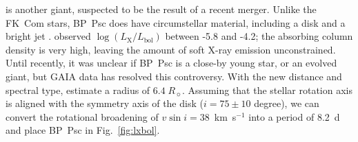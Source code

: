 \documentclass[linenumbers]{aastex631}
\begin{document}
 is another giant, suspected to be the result of a recent merger. Unlike the FK~Com stars, BP~Psc does have circumstellar material, including a disk and a bright jet \citep{Zuckerman_2008}.
\citet{2010ApJ...719L..65K} observed $\log(L_\mathrm{X}/L_\mathrm{bol})$ between -5.8 and -4.2; the absorbing column density is very high, leaving the amount of soft X-ray emission unconstrained. Until recently, it was unclear if BP~Psc is a close-by young star, or an evolved giant, but GAIA data has resolved this controversy. With the new distance and spectral type, \citet{2019MNRAS.490.3158C} estimate a radius of $6.4\;R_\sun{}$. Assuming that the stellar rotation axis is aligned with the symmetry axis of the disk ($i=75\pm10$ degree), we can convert the rotational broadening of $v \sin i=38$~km~s$^{-1}$ \citep{Zuckerman_2008} into a period of 8.2~d and place BP~Psc in Fig.~\ref{fig:lxbol}.

\end{document}

